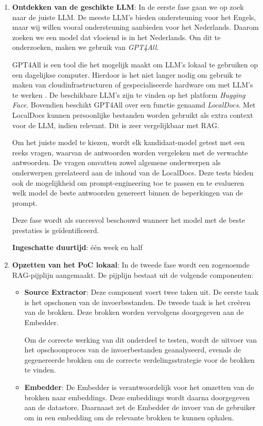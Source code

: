 \begin{enumerate}
    \item \textbf{Ontdekken van de geschikte \acrshort{LLM}}: In de eerste fase gaan we op zoek naar de juiste \acrshort{LLM}. De meeste \acrshort{LLM}'s bieden ondersteuning voor het Engels, maar wij willen vooral ondersteuning aanbieden voor het Nederlands. Daarom zoeken we een model dat vloeiend is in het Nederlands. Om dit te onderzoeken, maken we gebruik van \emph{GPT4All}.
    
    GPT4All is een tool die het mogelijk maakt om \acrshort{LLM}'s lokaal te gebruiken op een dagelijkse computer. Hierdoor is het niet langer nodig om gebruik te maken van cloudinfrastructuren of gespecialiseerde hardware om met \acrshort{LLM}'s te werken \autocite{NST2024}. De beschikbare \acrshort{LLM}'s zijn te vinden op het platform \emph{Hugging Face}. Bovendien beschikt GPT4All over een functie genaamd \emph{LocalDocs}. Met LocalDocs kunnen persoonlijke bestanden worden gebruikt als extra context voor de \acrshort{LLM}, indien relevant. Dit is zeer vergelijkbaar met RAG.
    
    Om het juiste model te kiezen, wordt elk kandidaat-model getest met een reeks vragen, waarvan de antwoorden worden vergeleken met de verwachte antwoorden. De vragen omvatten zowel algemene onderwerpen als onderwerpen gerelateerd aan de inhoud van de LocalDocs. Deze tests bieden ook de mogelijkheid om prompt-engineering toe te passen en te evalueren welk model de beste antwoorden genereert binnen de beperkingen van de prompt.
    
    Deze fase wordt als succesvol beschouwd wanneer het model met de beste prestaties is geïdentificeerd. 
    
    \textbf{Ingeschatte duurtijd}: één week en half
    
    \item \textbf{Opzetten van het PoC lokaal}: In de tweede fase wordt een zogenoemde RAG-pijplijn aangemaakt. De pijplijn bestaat uit de volgende componenten: 
    \begin{itemize} 
        \item \textbf{Source Extractor}: Deze component voert twee taken uit. De eerste taak is het opschonen van de invoerbestanden. De tweede taak is het creëren van de brokken. Deze brokken worden vervolgens doorgegeven aan de Embedder. 
               
        Om de correcte werking van dit onderdeel te testen, wordt de uitvoer van het opschoonproces van de invoerbestanden geanalyseerd, evenals de gegenereerde brokken om de correcte verdelingsstrategie voor de brokken te vinden. 
        \item \textbf{Embedder}: De Embedder is verantwoordelijk voor het omzetten van de brokken naar embeddings. Deze embeddings wordt daarna doorgegeven aan de datastore. Daarnaast zet de Embedder de invoer van de gebruiker om in een embedding om de relevante brokken te kunnen ophalen. 
        

\end{itemize}
\end{enumerate}
